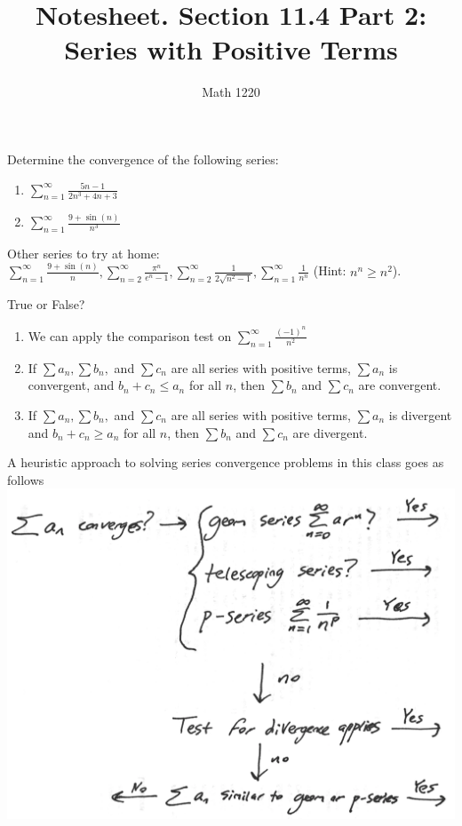\documentclass[12pt, a4paper]{article}
\author{Math 1220}
\title{Notesheet. Section 11.4 Part 2: Series with Positive Terms}
\date{}
\begin{document}
\maketitle
\nameline
\begin{ex}
Determine the convergence of the following series:
\begin{enumerate}
\item \(\sum_{n=1}^\infty \frac{5n-1}{2n^3+4n+3}\)
  \vspace{1.5in}
\item \(\sum_{n=1}^\infty \frac{9+\sin(n)}{n^3}\)
\end{enumerate}
\end{ex}
Other series to try at home:\\

\(\sum_{n=1}^\infty \frac{9+\sin(n)}{n}, \sum_{n=2}^\infty
\frac{\pi^n}{e^n-1}, \sum_{n=2}^\infty \frac{1}{2\sqrt{n^2-1}},
\sum_{n=1}^\infty \frac{1}{n^n}\) (Hint: \(n^n \geq n^2\)).
\begin{ex}
  True or False?
  \begin{enumerate}
  \item We can apply the comparison test on \(\sum_{n=1}^\infty
    \frac{(-1)^n}{n^2}\)
    \vspace{1in}
  \item If \(\sum a_n, \sum b_n, \) and \(\sum c_n\) are all series
    with positive terms, \(\sum a_n\) is convergent, and \(b_n+c_n
    \leq a_n\) for all \(n\), then \(\sum b_n\) and \(\sum c_n\) are
    convergent.
    \vspace{1in}
  \item If \(\sum a_n, \sum b_n, \) and \(\sum c_n\) are all series
    with positive terms, \(\sum a_n\) is divergent and \(b_n + c_n
    \geq a_n\) for 
    all \(n\), then \(\sum b_n\) and \(\sum c_n\) are divergent.
  \end{enumerate}
\end{ex}
\begin{rmk}
  A heuristic approach to solving series convergence problems in this
  class goes as follows \\
  \includegraphics[scale=0.35]{images/incomplete-series-convergence-flowchart}
\end{rmk}
\end{document}
